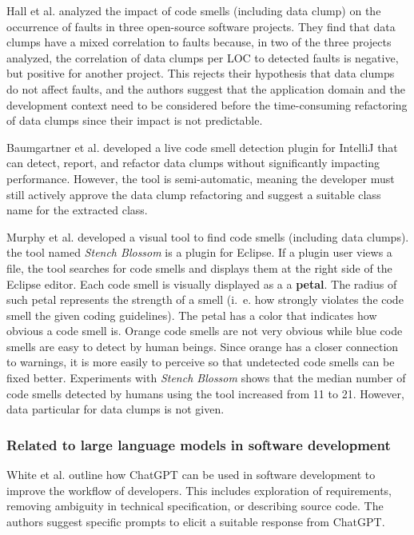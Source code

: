 Hall et al. analyzed the impact of code smells (including data clump) on the occurrence of faults in three open-source software projects. They find that data clumps have a mixed correlation to faults because, in two of the three projects analyzed, the correlation of data clumps per \ac{LOC} to detected faults is negative, but positive for another project. This rejects their hypothesis that data clumps do not affect faults, and the authors suggest that the application domain and the development context need to be considered before the time-consuming refactoring of data clumps since their impact is not predictable.  \cite{hallCodeSmellsHave2014}


Baumgartner et al. developed a live code smell detection plugin for IntelliJ that can detect, report, and refactor data clumps without significantly impacting performance. However, the tool is semi-automatic, meaning the developer must still actively approve the data clump refactoring and suggest a suitable class name for the extracted class. \cite{BaumgartnerAP23}

Murphy et al. \cite{stench_blossom} developed a visual tool to find code smells (including data clumps). the tool named \textit{Stench Blossom} is a plugin for Eclipse. If a plugin user views a file, the tool searches for code smells and displays them at the right side of the Eclipse editor. Each code smell is visually displayed as a a \textbf{petal}. The radius of such petal represents the strength of a smell (i.~e. how strongly violates the code smell the given coding guidelines). The petal has a color that indicates how obvious a code smell is. Orange code smells are not very obvious while blue code smells are easy to detect by human beings. Since orange has a closer connection to warnings, it is more easily to perceive so that undetected code smells can be fixed better. Experiments with \textit{Stench Blossom} shows that the median number of code smells detected by humans using the tool increased from 11 to 21. However, data particular for data clumps is not given.




\subsubsection{Related to large language models in software development}

White et al. \cite{White2023ChatGPTPP} outline how ChatGPT can be used in software development to improve the workflow of developers. This includes  exploration of requirements, removing ambiguity in technical specification, or describing source code. The authors suggest specific prompts to elicit a suitable response from ChatGPT.


